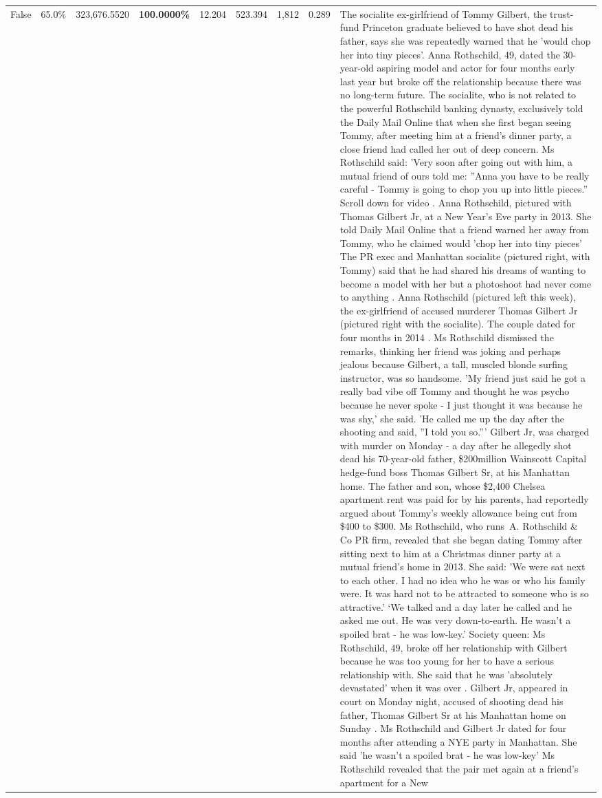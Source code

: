 \begin{table}[H]
\begin{tabular}{lllrlllll}
False & 65.0\% & 323,676.5520 & \bfseries \color{red} 100.0000\% & 12.204 & 523.394 & 1,812 & 0.289 & The socialite ex-girlfriend of Tommy Gilbert, the trust-fund Princeton graduate believed to have shot dead his father, says she was repeatedly warned that he 'would chop her into tiny pieces'. Anna Rothschild, 49, dated the 30-year-old aspiring model and actor for four months early last year but broke off the relationship because there was no long-term future. The socialite, who is not related to the powerful Rothschild banking dynasty, exclusively told the Daily Mail Online that when she first began seeing Tommy, after meeting him at a friend's dinner party, a close friend had called her out of deep concern. Ms Rothschild said: 'Very soon after going out with him, a mutual friend of ours told me: ''Anna you have to be really careful - Tommy is going to chop you up into little pieces.'' Scroll down for video . Anna Rothschild, pictured with Thomas Gilbert Jr, at a New Year's Eve party in 2013. She told Daily Mail Online that a friend warned her away from Tommy, who he claimed would 'chop her into tiny pieces' The PR exec and Manhattan socialite (pictured right, with Tommy) said that he had shared his dreams of wanting to become a model with her but a photoshoot had never come to anything . Anna Rothschild (pictured left this week), the ex-girlfriend of accused murderer Thomas Gilbert Jr (pictured right with the socialite). The couple dated for four months in 2014 . Ms Rothschild dismissed the remarks, thinking her friend was joking and perhaps jealous because Gilbert, a tall, muscled blonde surfing instructor, was so handsome. 'My friend just said he got a really bad vibe off Tommy and thought he was psycho because he never spoke - I just thought it was because he was shy,' she said. 'He called me up the day after the shooting and said, ''I told you so.''' Gilbert Jr, was charged with murder on Monday - a day after he allegedly shot dead his 70-year-old father, \$200million Wainscott Capital hedge-fund boss Thomas Gilbert Sr, at his Manhattan home. The father and son, whose \$2,400 Chelsea apartment rent was paid for by his parents, had reportedly argued about Tommy's weekly allowance being cut from \$400 to \$300. Ms Rothschild, who runs A. Rothschild \& Co PR firm, revealed that she began dating Tommy after sitting next to him at a Christmas dinner party at a mutual friend's home in 2013. She said: 'We were sat next to each other. I had no idea who he was or who his family were. It was hard not to be attracted to someone who is so attractive.' ‘We talked and a day later he called and he asked me out. He was very down-to-earth. He wasn’t a spoiled brat - he was low-key.’ Society queen: Ms Rothschild, 49, broke off her relationship with Gilbert because he was too young for her to have a serious relationship with. She said that he was 'absolutely devastated' when it was over . Gilbert Jr, appeared in court on Monday night, accused of shooting dead his father, Thomas Gilbert Sr at his Manhattan home on Sunday . Ms Rothschild and Gilbert Jr dated for four months after attending a NYE party in Manhattan. She said 'he wasn't a spoiled brat - he was low-key' Ms Rothschild revealed that the pair met again at a friend’s apartment for a New 
\end{tabular}
\end{table}
